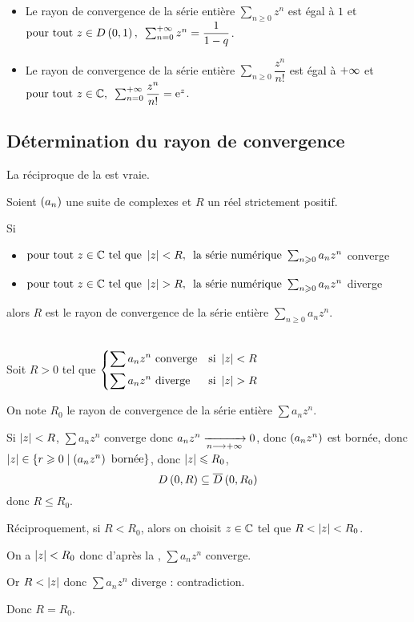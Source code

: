 \begin{ex}
\begin{itemize}
    \item Le rayon de convergence de la série entière \(\sum_{n\geq0}z^n\) est égal à \(1\) et \(\quantifs{\tpt z\in\disqueo{0}{1}}\sum_{n=0}^{\pinf}z^n=\dfrac{1}{1-q}\). \\
    \item Le rayon de convergence de la série entière \(\sum_{n\geq0}\dfrac{z^n}{n!}\) est égal à \(+\infty\) et \(\quantifs{\tpt z\in\C}\sum_{n=0}^{\pinf}\dfrac{z^n}{n!}=\e{z}\).
\end{itemize}
\end{ex}

\subsection{Détermination du rayon de convergence}

La réciproque de la  est vraie.

\begin{prop}
Soient \(\left(a_n\right)\) une suite de complexes et \(R\) un réel strictement positif.

Si

\begin{itemize}
    \item \(\quantifs{\tpt z\in\C\text{ tel que }\abs{z}<R}\text{la série numérique }\sum_{n\geq0}a_nz^n\) converge \\
    \item \(\quantifs{\tpt z\in\C\text{ tel que }\abs{z}>R}\text{la série numérique }\sum_{n\geq0}a_nz^n\) diverge
\end{itemize}

alors \(R\) est le rayon de convergence de la série entière \(\sum_{n\geq0}a_nz^n\).
\end{prop}

\begin{dem}~\\
Soit \(R>0\) tel que \(\begin{dcases}
\sum a_nz^n\text{ converge} &\text{si }\left\lvert z\right\rvert<R \\
\sum a_nz^n\text{ diverge} &\text{si }\left\lvert z\right\rvert>R
\end{dcases}\)

On note \(R_0\) le rayon de convergence de la série entière \(\sum a_nz^n\).

Si \(\left\lvert z\right\rvert<R\), \(\sum a_nz^n\) converge donc \(a_nz^n\xrightarrow[n\longrightarrow+\infty]{}0\), donc \(\left(a_nz^n\right)\) est bornée, donc \(\left\lvert z\right\rvert\in\left\lbrace r\geqslant0\;\middle|\;\left(a_nz^n\right)\text{ bornée}\right\rbrace\), donc \(\left\lvert z\right\rvert\leqslant R_0\), \ie \[\disqueo{0}{R}\subset\disquef{0}{R_0}\] donc \(R\leq R_0\).

Réciproquement, si \(R<R_0\), alors on choisit \(z\in\mathbb{C}\) tel que \(R<\left\lvert z\right\rvert<R_0\).

On a \(\left\lvert z\right\rvert<R_0\) donc d'après la , \(\sum a_nz^n\) converge.

Or \(R<\left\lvert z\right\rvert\) donc \(\sum a_nz^n\) diverge : contradiction.

Donc \(R=R_0\).
\end{dem}

